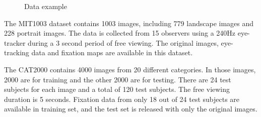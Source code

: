\documentclass[12pt]{article}
\begin{document}
\begin{figure}[!h]
    \centering
    \hspace{1mm}
    \hspace{1mm}
    \caption{Data example}
    \label{img:data_example_2}
\end{figure}

The MIT1003 dataset contains 1003 images, including 779 landscape images and 228 portrait images.
The data is collected from 15 observers using a 240Hz eye-tracker during a 3 second period of
free viewing. The original images, eye-tracking data and fixation maps are available in this dataset.

The CAT2000 contains 4000 images from 20 different categories. In those images, 2000 are for training and the other 2000
are for testing. There are 24 test subjects for each image and a total of 120 test subjects. The free
viewing duration is 5 seconds. Fixation data from only 18 out of 24 test subjects are available in training
set, and the test set is released with only the original images.
\end{document}
